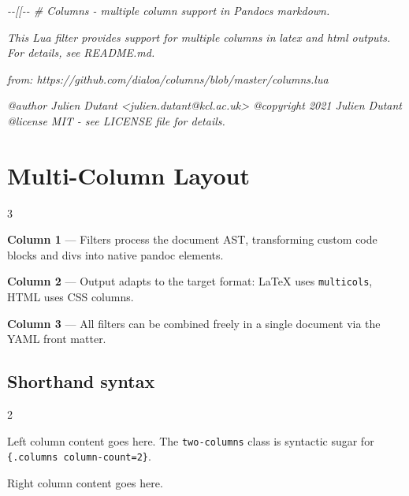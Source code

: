 \documentclass[
]{article}
\newenvironment{Shaded}{}{}
\newcommand{\CommentTok}[1]{\textcolor[rgb]{0.38,0.63,0.69}{\textit{#1}}}
\begin{document}
\begin{Shaded}
\begin{Highlighting}[]
\CommentTok{{-}{-}[[{-}{-} \# Columns {-} multiple column support in Pandoc\textquotesingle{}s markdown.}

\CommentTok{This Lua filter provides support for multiple columns in}
\CommentTok{latex and html outputs. For details, see README.md.}

\CommentTok{from: https://github.com/dialoa/columns/blob/master/columns.lua}

\CommentTok{@author Julien Dutant \textless{}julien.dutant@kcl.ac.uk\textgreater{}}
\CommentTok{@copyright 2021 Julien Dutant}
\CommentTok{@license MIT {-} see LICENSE file for details.}
\end{Highlighting}
\end{Shaded}

\section{Multi-Column Layout}\label{multi-column-layout}

{\setlength{\columnsep}{1.5em}
\begin{multicols}{3}

\textbf{Column 1} --- Filters process the document AST, transforming
custom code blocks and divs into native pandoc elements.

\columnbreak

\textbf{Column 2} --- Output adapts to the target format: LaTeX uses
\texttt{multicols}, HTML uses CSS columns.

\columnbreak

\textbf{Column 3} --- All filters can be combined freely in a single
document via the YAML front matter.

\end{multicols}
}

\subsection{Shorthand syntax}\label{shorthand-syntax}

{\begin{multicols}{2}

Left column content goes here. The \texttt{two-columns} class is
syntactic sugar for \texttt{\{.columns\ column-count=2\}}.

\columnbreak

Right column content goes here.

\end{multicols}
}
\end{document}
